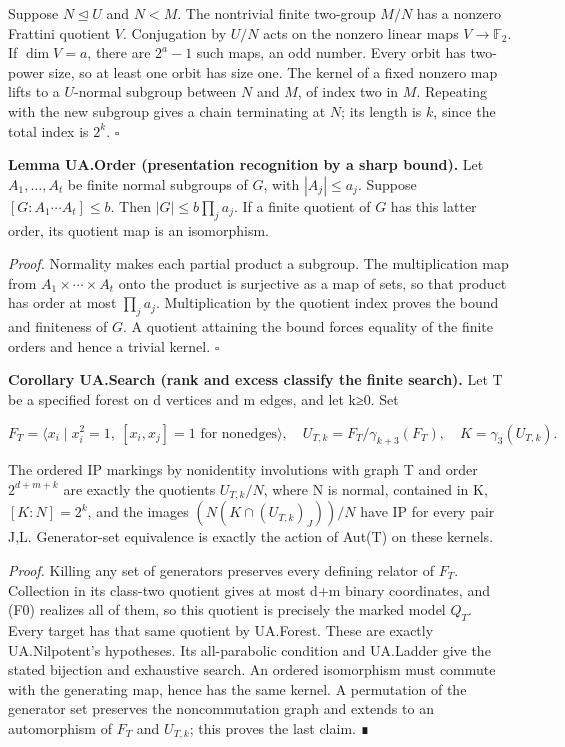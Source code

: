 Suppose \(N\unlhd U\) and \(N<M\). The nontrivial finite two-group
\(M/N\) has a nonzero Frattini quotient \(V\). Conjugation by \(U/N\)
acts on the nonzero linear maps \(V\to\mathbb F_2\). If \(\dim V=a\),
there are \(2^a-1\) such maps, an odd number. Every orbit has two-power
size, so at least one orbit has size one. The kernel of a fixed nonzero
map lifts to a \(U\)-normal subgroup between \(N\) and \(M\), of index
two in \(M\). Repeating with the new subgroup gives a chain terminating
at \(N\); its length is \(k\), since the total index is \(2^k\).
\(\square\)

\textbf{Lemma UA.Order (presentation recognition by a sharp bound).} Let
\(A_1,\ldots,A_t\) be finite normal subgroups of \(G\), with
\(|A_j|\leq a_j\). Suppose \([G:A_1\cdots A_t]\leq b\). Then
\(|G|\leq b\prod_j a_j\). If a finite quotient of \(G\) has this latter
order, its quotient map is an isomorphism.

\emph{Proof.} Normality makes each partial product a subgroup. The
multiplication map from \(A_1\times\cdots\times A_t\) onto the product
is surjective as a map of sets, so that product has order at most
\(\prod_j a_j\). Multiplication by the quotient index proves the bound
and finiteness of \(G\). A quotient attaining the bound forces equality
of the finite orders and hence a trivial kernel. \(\square\)

\textbf{Corollary UA.Search (rank and excess classify the finite
search).} Let T be a specified forest on d vertices and m edges, and let
k≥0. Set

\[
 F_T=\langle x_i\mid x_i^2=1,\ [x_i,x_j]=1\text{ for nonedges}\rangle,
 \quad U_{T,k}=F_T/\gamma_{k+3}(F_T),\quad K=\gamma_3(U_{T,k}).
\]

The ordered IP markings by nonidentity involutions with graph T and
order \(2^{d+m+k}\) are exactly the quotients \(U_{T,k}/N\), where N is
normal, contained in K, \([K:N]=2^k\), and the images
\((N(K\cap(U_{T,k})_J))/N\) have IP for every pair J,L. Generator-set
equivalence is exactly the action of Aut(T) on these kernels.

\emph{Proof.} Killing any set of generators preserves every defining
relator of \(F_T\). Collection in its class-two quotient gives at most
d+m binary coordinates, and (F0) realizes all of them, so this quotient
is precisely the marked model \(Q_T\). Every target has that same
quotient by UA.Forest. These are exactly UA.Nilpotent's hypotheses. Its
all-parabolic condition and UA.Ladder give the stated bijection and
exhaustive search. An ordered isomorphism must commute with the
generating map, hence has the same kernel. A permutation of the
generator set preserves the noncommutation graph and extends to an
automorphism of \(F_T\) and \(U_{T,k}\); this proves the last claim. ∎

